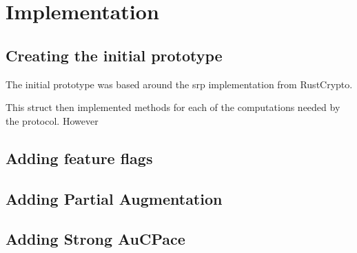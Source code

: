 \chapter{Implementation}
\label{chap:impl}

\section{Creating the initial prototype}
The initial prototype was based around the \gls{srp} implementation from RustCrypto.


This struct then implemented methods for each of the computations needed by the protocol.
However 

\section{Adding feature flags}

\section{Adding Partial Augmentation}

\section{Adding Strong AuCPace}


